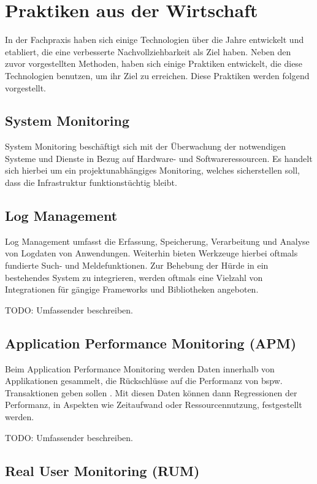 \section{Praktiken aus der Wirtschaft}

In der Fachpraxis haben sich einige Technologien über die Jahre entwickelt und etabliert, die eine verbesserte Nachvollziehbarkeit als Ziel haben. Neben den zuvor vorgestellten Methoden, haben sich einige Praktiken entwickelt, die diese Technologien benutzen, um ihr Ziel zu erreichen. Diese Praktiken werden folgend vorgestellt.

\subsection{System Monitoring}

System Monitoring beschäftigt sich mit der Überwachung der notwendigen Systeme und Dienste in Bezug auf Hardware- und Softwareressourcen. Es handelt sich hierbei um ein projektunabhängiges Monitoring, welches sicherstellen soll, dass die Infrastruktur funktionstüchtig bleibt.

\subsection{Log Management}

Log Management umfasst die Erfassung, Speicherung, Verarbeitung und Analyse von Logdaten von Anwendungen. Weiterhin bieten Werkzeuge hierbei oftmals fundierte Such- und Meldefunktionen. Zur Behebung der Hürde in ein bestehendes System zu integrieren, werden oftmals eine Vielzahl von Integrationen für gängige Frameworks und Bibliotheken angeboten.

{\color{red}TODO: Umfassender beschreiben.}

\subsection{Application Performance Monitoring (APM)}

Beim Application Performance Monitoring werden Daten innerhalb von Applikationen gesammelt, die Rückschlüsse auf die Performanz von bspw. Transaktionen geben sollen \cite{StudyingTheEffectivenessOfAPMTools}. Mit diesen Daten können dann Regressionen der Performanz, in Aspekten wie Zeitaufwand oder Ressourcennutzung, festgestellt werden.

{\color{red}TODO: Umfassender beschreiben.}

\subsection{Real User Monitoring (RUM)}

